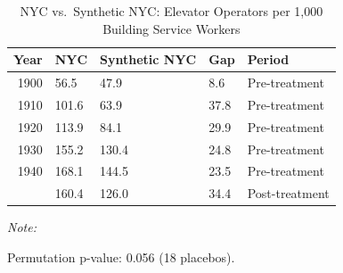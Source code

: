 \begin{table}[!h]
\centering
\caption{NYC vs.~Synthetic NYC: Elevator Operators per 1,000 Building Service Workers}
\centering
\begin{threeparttable}
\begin{tabular}[t]{rllll}
\toprule
Year & NYC & Synthetic NYC & Gap & Period\\
\midrule
1900 & 56.5 & 47.9 & 8.6 & Pre-treatment\\
1910 & 101.6 & 63.9 & 37.8 & Pre-treatment\\
1920 & 113.9 & 84.1 & 29.9 & Pre-treatment\\
1930 & 155.2 & 130.4 & 24.8 & Pre-treatment\\
1940 & 168.1 & 144.5 & 23.5 & Pre-treatment\\
\addlinespace
1950 & 160.4 & 126.0 & 34.4 & Post-treatment\\
\bottomrule
\end{tabular}
\begin{tablenotes}
\item \textit{Note: } 
\item Permutation p-value: 0.056 (18 placebos).
\end{tablenotes}
\end{threeparttable}
\end{table}
